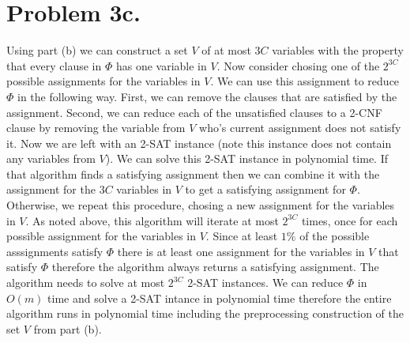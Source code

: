 \documentclass[12pt]{article}
\begin{document}
\section*{Problem 3c.}
Using part (b) we can construct a set $V$ of at most $3C$ variables with the
property that every clause in $\Phi$ has one variable in $V$. Now consider
chosing one of the $2^{3C}$ possible assignments for the variables in $V$. We
can use this assignment to reduce $\Phi$ in the following way. First, we can
remove the clauses that are satisfied by the assignment. Second, we can reduce
each of the unsatisfied clauses to a 2-CNF clause by removing the variable from
$V$ who's current assignment does not satisfy it. Now we are left with an 2-SAT
instance (note this instance does not contain any variables from $V$). We can
solve this 2-SAT instance in polynomial time. If that algorithm finds a
satisfying assignment then we can combine it with the assignment for the $3C$
variables in $V$ to get a satisfying assignment for $\Phi$. Otherwise, we repeat
this procedure, chosing a new assignment for the variables in $V$. As noted
above, this algorithm will iterate at most $2^{3C}$ times, once for each
possible assignment for the variables in $V$. Since at least $1\%$ of the
possible asssignments satisfy $\Phi$ there is at least one assignment for the
variables in $V$ that satisfy $\Phi$ therefore the algorithm always returns a
satisfying assignment. The algorithm needs to solve at most $2^{3C}$ 2-SAT
instances. We can reduce $\Phi$ in $O(m)$ time and solve a 2-SAT intance in
polynomial time therefore the entire algorithm runs in polynomial time including
the preprocessing construction of the set $V$ from part (b).
\end{document}
